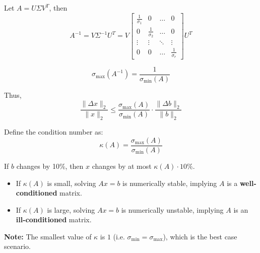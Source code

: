 \begin{derivation}
Let \( A = U \Sigma V^T \), then 
\[
A^{-1} = V \Sigma^{-1} U^T = V 
\begin{bmatrix}
\frac{1}{\sigma_1} & 0 & \ldots & 0 \\
0 & \frac{1}{\sigma_2} & \ldots & 0 \\
\vdots & \vdots & \ddots & \vdots \\
0 & 0 & \ldots & \frac{1}{\sigma_r}
\end{bmatrix} 
U^T
\]

\[
\sigma_{\max}(A^{-1}) = \frac{1}{\sigma_{\min}(A)}
\]

Thus,
\[
\frac{\| \Delta x \|_2}{\| x \|_2} \leq \frac{\sigma_{\max}(A)}{\sigma_{\min}(A)} \cdot \frac{\| \Delta b \|_2}{\| b \|_2}
\]

Define the condition number as:
\[
\kappa(A) = \frac{\sigma_{\max}(A)}{\sigma_{\min}(A)}
\]

If \( b \) changes by 10\%, then \( x \) changes by at most \( \kappa(A) \cdot 10\% \).

\begin{itemize}
    \item If \( \kappa(A) \) is small, solving \( Ax = b \) is numerically stable, implying \( A \) is a \textbf{well-conditioned} matrix.
    \item If \( \kappa(A) \) is large, solving \( Ax = b \) is numerically unstable, implying \( A \) is an \textbf{ill-conditioned} matrix.
\end{itemize}
\vspace{1em}

\textbf{Note:} The smallest value of $\kappa$ is $1$ (i.e. $\sigma_{\min} = \sigma_{\max}$), which is the best case scenario.
\end{derivation}

